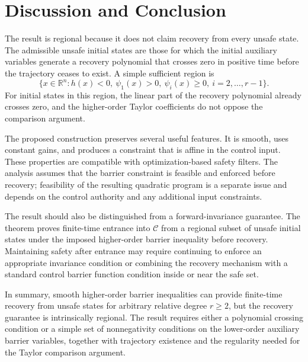 \documentclass[11pt]{article}
\newcommand{\R}{\mathbb{R}}
\newcommand{\safeSet}{\mathcal{C}}
\begin{document}
\section{Discussion and Conclusion}

The result is regional because it does not claim recovery from every unsafe state. The admissible unsafe initial states are those for which the initial auxiliary variables generate a recovery polynomial that crosses zero in positive time before the trajectory ceases to exist. A simple sufficient region is
\begin{equation}
\{
x\in\R^n:
h(x)<0,\
\psi_1(x)>0,\
\psi_i(x)\ge0,\ i=2,\dots,r-1
\}.
\label{eq:simple-region-set}
\end{equation}
For initial states in this region, the linear part of the recovery polynomial already crosses zero, and the higher-order Taylor coefficients do not oppose the comparison argument.

The proposed construction preserves several useful features. It is smooth, uses constant gains, and produces a constraint that is affine in the control input. These properties are compatible with optimization-based safety filters. The analysis assumes that the barrier constraint is feasible and enforced before recovery; feasibility of the resulting quadratic program is a separate issue and depends on the control authority and any additional input constraints.

The result should also be distinguished from a forward-invariance guarantee. The theorem proves finite-time entrance into $\safeSet$ from a regional subset of unsafe initial states under the imposed higher-order barrier inequality before recovery. Maintaining safety after entrance may require continuing to enforce an appropriate invariance condition or combining the recovery mechanism with a standard control barrier function condition inside or near the safe set.

In summary, smooth higher-order barrier inequalities can provide finite-time recovery from unsafe states for arbitrary relative degree $r\ge2$, but the recovery guarantee is intrinsically regional. The result requires either a polynomial crossing condition or a simple set of nonnegativity conditions on the lower-order auxiliary barrier variables, together with trajectory existence and the regularity needed for the Taylor comparison argument.
\end{document}
